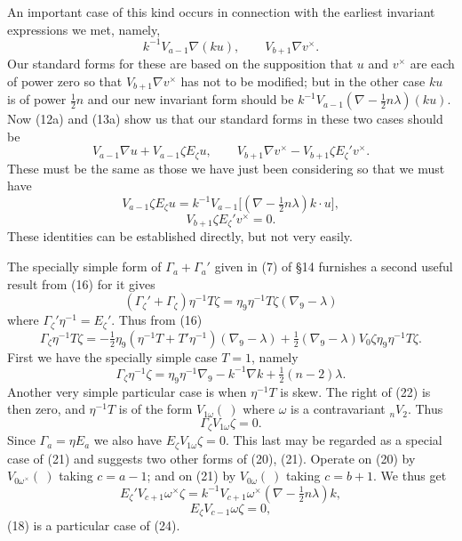 \documentclass[11pt]{article}
\begin{document}
\indent An important case of this kind occurs in connection with the earliest invariant expressions we met, namely,
\[
k^{-1}V_{a-1}\nabla(ku),\qquad V_{b+1}\nabla v^\times.
\]
Our standard forms for these are based on the supposition that $u$ and $v^\times$ are each of power zero so that $V_{b+1}\nabla v^\times$ has not to be modified; but in the other case $ku$ is of power $\tfrac12n$ and our new invariant form should be $k^{-1}V_{a-1}(\nabla-\tfrac12n\lambda)(ku)$. Now (12a) and (13a) show us that our standard forms in these two cases should be
\[
V_{a-1}\nabla u+V_{a-1}\zeta E_\zeta u,\qquad V_{b+1}\nabla v^\times-V_{b+1}\zeta E_\zeta'v^\times.
\]
These must be the same as those we have just been considering so that we must have
\begin{equation}V_{a-1}\zeta E_\zeta u=k^{-1}V_{a-1}\bigl[(\nabla-\tfrac12n\lambda)k\mathbin{\cdot}u\bigr],\tag{20}\end{equation}
\begin{equation}V_{b+1}\zeta E_\zeta'v^\times=0.\tag{21}\end{equation}
These identities can be established directly, but not very easily.

The specially simple form of $\Gamma_a+\Gamma_a'$ given in (7) of \S14 furnishes a second useful result from (16) for it gives
\[
(\Gamma_\zeta'+\Gamma_\zeta)\eta^{-1}T\zeta=\eta_9\eta^{-1}T\zeta(\nabla_9-\lambda)
\]
where $\Gamma_\zeta'\eta^{-1}=E_\zeta'$. Thus from (16)
\begin{equation}\Gamma_\zeta\eta^{-1}T\zeta=-\tfrac12\eta_9(\eta^{-1}T+T'\eta^{-1})(\nabla_9-\lambda)+\tfrac12(\nabla_9-\lambda)V_0\zeta\eta_9\eta^{-1}T\zeta.\tag{22}\end{equation}
First we have the specially simple case $T=1$, namely
\begin{equation}\Gamma_\zeta\eta^{-1}\zeta=\eta_9\eta^{-1}\nabla_9-k^{-1}\nabla k+\tfrac12(n-2)\lambda.\tag{23}\end{equation}
Another very simple particular case is when $\eta^{-1}T$ is skew. The right of (22) is then zero, and $\eta^{-1}T$ is of the form $V_{1\omega}(\ )$ where $\omega$ is a contravariant ${}_nV_2$. Thus
\[
\Gamma_\zeta V_{1\omega}\zeta=0.
\]
Since $\Gamma_a=\eta E_a$ we also have $E_\zeta V_{1\omega}\zeta=0$. This last may be regarded as a special case of (21) and suggests two other forms of (20), (21). Operate on (20) by $V_{0\omega^\times}(\ )$ taking $c=a-1$; and on (21) by $V_{0\omega}(\ )$ taking $c=b+1$. We thus get
\begin{equation}E_\zeta'V_{c+1}\omega^\times\zeta=k^{-1}V_{c+1}\omega^\times(\nabla-\tfrac12n\lambda)k,\tag{24}\end{equation}
\begin{equation}E_\zeta V_{c-1}\omega\zeta=0,\tag{25}\end{equation}
(18) is a particular case of (24).
\end{document}
